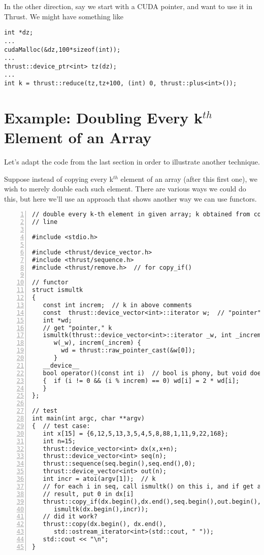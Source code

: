 In the other direction, say we start with a CUDA pointer, and want to
use it in Thrust.  We might have something like

\begin{lstlisting}
int *dz;
...
cudaMalloc(&dz,100*sizeof(int));
...
thrust::device_ptr<int> tz(dz);
...
int k = thrust::reduce(tz,tz+100, (int) 0, thrust::plus<int>());
\end{lstlisting}

\section{Example:  Doubling Every k$^{th}$ Element of an Array}
\label{doubling}

Let's adapt the code from the last section in order to illustrate
another technique.

Suppose instead of copying every k$^{th}$ element of an array (after
this first one), we wish to merely double each such element.  There are
various ways we could do this, but here we'll use an approach that shows
another way we can use functors.

\begin{lstlisting}[numbers=left]
// double every k-th element in given array; k obtained from command
// line

#include <stdio.h>

#include <thrust/device_vector.h>
#include <thrust/sequence.h>
#include <thrust/remove.h>  // for copy_if()

// functor
struct ismultk
{
   const int increm;  // k in above comments
   const  thrust::device_vector<int>::iterator w;  // "pointer" to our array
   int *wd;
   // get "pointer," k 
   ismultk(thrust::device_vector<int>::iterator _w, int _increm):
      w(_w), increm(_increm) {
        wd = thrust::raw_pointer_cast(&w[0]);
      }
   __device__
   bool operator()(const int i)  // bool is phony, but void doesn't work
   {  if (i != 0 && (i % increm) == 0) wd[i] = 2 * wd[i];
   }
};

// test
int main(int argc, char **argv)
{  // test case:
   int x[15] = {6,12,5,13,3,5,4,5,8,88,1,11,9,22,168};
   int n=15;
   thrust::device_vector<int> dx(x,x+n);
   thrust::device_vector<int> seq(n);
   thrust::sequence(seq.begin(),seq.end(),0);
   thrust::device_vector<int> out(n);
   int incr = atoi(argv[1]);  // k
   // for each i in seq, call ismultk() on this i, and if get a true
   // result, put 0 in dx[i] 
   thrust::copy_if(dx.begin(),dx.end(),seq.begin(),out.begin(),
      ismultk(dx.begin(),incr));
   // did it work?
   thrust::copy(dx.begin(), dx.end(),
      std::ostream_iterator<int>(std::cout, " "));
   std::cout << "\n";
}
\end{lstlisting}

